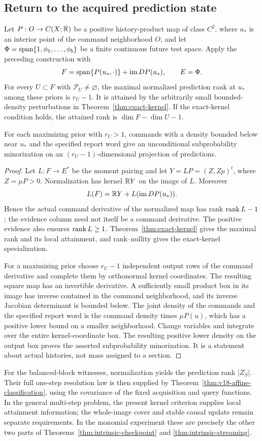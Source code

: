 \subsection{Return to the acquired prediction state}
\begin{corollary}
\label{cor:kernel-history-rank}
Let $P:O\to C(X;\mathbb R)$ be a positive history-product map of class $C^2$,
where $u_*$ is an interior point of the command neighborhood $O$, and let
$\Phi=\operatorname{span}\{1,\phi_1,\ldots,\phi_b\}$ be a finite continuous
future test space. Apply the preceding construction with
\[
 F=\operatorname{span}\{P(u_*,\cdot)\}+\operatorname{im}DP(u_*),\qquad E=\Phi.
\]
For every $U\subset F$ with $\mathcal P_U\ne\varnothing$, the maximal
normalized prediction rank at $u_*$ among these priors is $r_U-1$.
It is attained by the arbitrarily small bounded-density perturbations
in Theorem~\ref{thm:exact-kernel}. If the exact-kernel condition holds,
the attained rank is $\dim F-\dim U-1$.

For each maximizing prior with $r_U>1$, commands with a density
bounded below near $u_*$
and the specified report word give an unconditional subprobability
minorization on an $(r_U-1)$-dimensional projection of predictions.
\end{corollary}
\begin{proof}
Let $L:F\to E^*$ be the moment pairing and let
$Y=LP=(Z,Zp)^t$, where $Z=\mu P>0$. Normalization has kernel
$\mathbb R Y$ on the image of $L$. Moreover
\[
 L(F)=\mathbb R Y+L(\operatorname{im}DP(u_*)).
\]
Hence the actual command derivative of the normalized map has rank
$\operatorname{rank} L-1$; the evidence column need not itself be a command
derivative. The positive evidence also ensures $\operatorname{rank} L\ge1$.
Theorem~\ref{thm:exact-kernel} gives the maximal rank and its local
attainment, and rank--nullity gives the exact-kernel specialization.

For a maximizing prior choose $r_U-1$ independent output rows of the
command derivative and complete them by orthonormal kernel coordinates.
The resulting square map has an invertible derivative. A sufficiently
small product box in its image has inverse contained in the command
neighborhood, and its inverse Jacobian determinant is bounded below.
The joint density of the commands and the specified report word is the
command density times $\mu P(u)$, which has a positive lower bound on
a smaller neighborhood. Change variables and integrate over the entire
kernel-coordinate box. The resulting positive lower density on the
output box proves the asserted subprobability minorization. It is a
statement about actual histories, not mass assigned to a section.
\end{proof}

For the balanced-block witnesses, normalization yields the prediction
rank $|Z_S|$. Their full one-step resolution law is then supplied by
Theorem~\ref{thm:v18-affine-classification}, using the covariance of the
fixed acquisition and query functions. In the general multi-step problem,
the present kernel criterion supplies local attainment information; the
whole-image cover and stable causal update remain separate requirements.
In the monomial experiment these are precisely the other two parts of
Theorems~\ref{thm:intrinsic-checkpoint} and
\ref{thm:intrinsic-streaming}.
